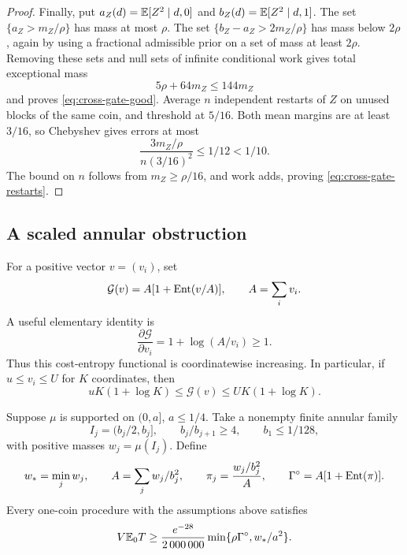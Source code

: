 \begin{proof}
Finally, put \(a_Z(d)=\mathbb E[Z^2\mid d,0]\) and
\(b_Z(d)=\mathbb E[Z^2\mid d,1]\).
The set \(\{a_Z>m_Z/\rho\}\) has mass at most \(\rho\).
The set \(\{b_Z-a_Z>2m_Z/\rho\}\) has mass below \(2\rho\),
again by using a fractional admissible prior on a set of mass
at least \(2\rho\).  Removing these sets and null sets of infinite
conditional work gives total exceptional mass
\[
 5\rho+64m_Z\le144m_Z
\]
and proves \eqref{eq:cross-gate-good}.
Average \(n\) independent restarts of \(Z\) on unused blocks of the
same coin, and threshold at \(5/16\).
Both mean margins are at least \(3/16\), so Chebyshev gives errors
at most
\[
 \frac{3m_Z/\rho}{n(3/16)^2}\le1/12<1/10.
\]
The bound on \(n\) follows from \(m_Z\ge\rho/16\), and work adds,
proving \eqref{eq:cross-gate-restarts}.
\end{proof}

\subsection{A scaled annular obstruction}

For a positive vector \(v=(v_i)\), set
\[
 \mathcal G(v)=A[1+\operatorname{Ent}(v/A)],\qquad A=\sum_i v_i.
\]
A useful elementary identity is
\begin{equation}
 \frac{\partial\mathcal G}{\partial v_i}
 =1+\log(A/v_i)\ge1.
 \label{eq:cross-entropy-monotone}
\end{equation}
Thus this cost-entropy functional is coordinatewise increasing.
In particular, if \(u\le v_i\le U\) for \(K\) coordinates, then
\begin{equation}
 uK(1+\log K)\le\mathcal G(v)\le UK(1+\log K).
 \label{eq:cross-entropy-sandwich}
\end{equation}

\begin{proposition}
\label{prop:scaled-annular}
Suppose \(\mu\) is supported on \((0,a]\), \(a\le1/4\).
Take a nonempty finite annular family
\[
 I_j=(b_j/2,b_j],\qquad b_j/b_{j+1}\ge4,\qquad
 b_1\le1/128,
\]
with positive masses \(w_j=\mu(I_j)\).  Define
\[
 w_*=\min_jw_j,\qquad
 A=\sum_jw_j/b_j^2,\qquad
 \pi_j=\frac{w_j/b_j^2}{A},\qquad
 \Gamma^{\circ}=A[1+\operatorname{Ent}(\pi)].
\]
Every one-coin procedure with the assumptions above satisfies
\begin{equation}
 V\mathbb E_0T\ge
 \frac{e^{-28}}{2\,000\,000}
       \min\{\rho\Gamma^{\circ},w_*/a^2\}.
 \label{eq:cross-scaled-annular}
\end{equation}
\end{proposition}

